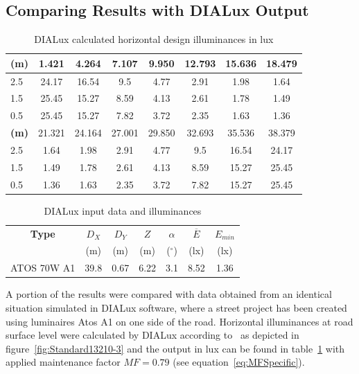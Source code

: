 \subsection{Comparing Results with DIALux Output}

\begin{table}[h]
	\renewcommand{\arraystretch}{1.3}
	\caption{DIALux calculated horizontal design illuminances in lux}
 	\label{tab:DialuxOneSideLamps}
	\centering
  \begin{tabular}{ l || c | c | c | c | c | c | c }
    \hline
    \textbf{(m)} & 1.421 & 4.264 & 7.107 & 9.950 & 12.793 & 15.636 & 18.479\\ \hline \hline
    2.5 & 24.17 & 16.54 & 9.5 & 4.77 & 2.91 & 1.98 & 1.64\\ \hline
		1.5 & 25.45 & 15.27 & 8.59 & 4.13 & 2.61 & 1.78 & 1.49\\ \hline
		0.5 & 25.45 & 15.27 & 7.82 & 3.72 & 2.35 & 1.63 & 1.36\\ \hline \hline \hline
		\textbf{(m)} & 21.321 & 24.164 & 27.001 & 29.850 & 32.693 & 35.536 & 38.379\\ \hline \hline
		2.5 & 1.64 & 1.98 & 2.91 & 4.77 & 9.5 & 16.54 & 24.17\\ \hline
		1.5 & 1.49 & 1.78 & 2.61 & 4.13 & 8.59 & 15.27 & 25.45\\ \hline
		0.5 & 1.36 & 1.63 & 2.35 & 3.72 & 7.82 & 15.27 & 25.45\\ \hline
  \end{tabular}
\end{table}

\begin{table}[h]
	\renewcommand{\arraystretch}{1.3}
	\caption{DIALux input data and illuminances}
 	\label{tab:DialuxIlluminances}
	\centering
  \begin{tabular}{ c | c | c | c | c | c | c }
    \hline
    \textbf{Type} & $D_X$ & $D_Y$ & $Z$ & $\alpha$ & $\overline{E}$ & $E_{min}$\\
		& (m) & (m) & (m) & ($^\circ$) & (lx) & (lx)\\ \hline
    ATOS 70W A1 & 39.8 & 0.67 & 6.22 & 3.1 & 8.52 & 1.36\\ \hline
  \end{tabular}
\end{table}

A portion of the results were compared with data obtained from an identical situation simulated in DIALux software, where a street project has been created using luminaires Atos A1 on one side of the road. Horizontal illuminances at road surface level were calculated by DIALux according to~\cite{CSN_EN_13201-3} as depicted in figure~\ref{fig:Standard13210-3} and the output in lux can be found in table~\ref{tab:DialuxOneSideLamps} with applied maintenance factor $MF=0.79$ (see equation~\ref{eq:MFSpecific}).

